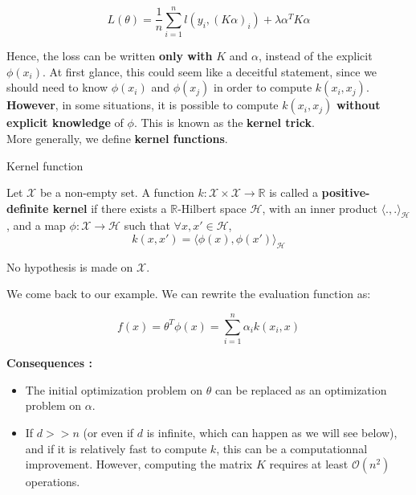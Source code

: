 \documentclass[
10pt, %
a4paper, %
oneside, %
headinclude,footinclude, %
BCOR5mm, %
]{scrartcl}
\begin{document}
\begin{equation*}
    L(\theta) = \frac{1}{n} \sum^{n}_{i=1} l(y_i, (K\alpha)_i)+\lambda \alpha^TK\alpha
\end{equation*}

Hence, the loss can be written \textbf{{only with }} $K$ and $\alpha$, instead of the explicit $\phi(x_i)$. At first glance, this could seem like a deceitful statement, since we should need to know $\phi(x_i)$ and $\phi(x_j)$ in order to compute $k(x_i, x_j)$. \textbf{{However}}, in some situations, it is possible to compute $k(x_i, x_j)$ \textbf{{without explicit knowledge}} of $\phi$. This is known as the \textbf{{kernel trick}}.
\\

More generally, we define \textbf{{kernel functions}}.

\begin{definition}{Kernel function}

    Let $ \mathcal{X} $ be a non-empty set. A function $k: \mathcal{X} \times \mathcal{X} \rightarrow \mathbb{R}$ is called a \textbf{{positive-definite kernel}}  if there exists a $ \mathbb{R} $-Hilbert space $ \mathcal{H} $, with an inner product $ \langle .,. \rangle_{ \mathcal{H} }$, and a map $\phi: \mathcal{X} \rightarrow \mathcal{H} $ such that $\forall x, x'\in \mathcal{H} $,
    \begin{equation*}
	k(x,x') = \langle\phi(x),\phi(x') \rangle_{ \mathcal{H} }
    \end{equation*}
\end{definition}

\begin{remark}

    No hypothesis is made on $ \mathcal{X} $.
    
\end{remark}

We come back to our example. We can rewrite the evaluation function as:

\begin{equation*}
    f(x) = \theta^T\phi(x) = \sum^{n}_{i=1} \alpha_ik(x_i,x)
\end{equation*}

\textbf{{Consequences :}}
\begin{itemize}
    \item The initial optimization problem on $\theta$ can be replaced as an optimization problem on $\alpha$.
    \item If $d>>n$ (or even if $d$ is infinite, which can happen as we will see below), and if it is relatively fast to compute $k$, this can be a computationnal improvement.  However, computing the matrix $K$ requires at least $ \mathcal{O} (n^2)$ operations.
\end{itemize}
\end{document}
